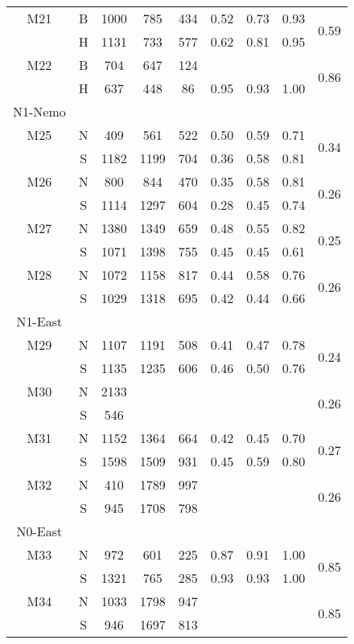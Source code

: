 \begin{longtable}{c c c c c c c c c}
  M21 & B & 1000 & 785 & 434 & 0.52 & 0.73 & 0.93 & \multirow{2}{*}{0.59} \\
      & H & 1131 & 733 & 577 & 0.62 & 0.81 & 0.95 & \\
  M22 & B & 704 & 647 & 124 &  &  &  & \multirow{2}{*}{0.86} \\
      & H & 637 & 448 & 86 & 0.95 & 0.93 & 1.00 & \\
  \midrule
  N1-Nemo\\
  \midrule
  M25 & N & 409 & 561 & 522 & 0.50 & 0.59 & 0.71 & \multirow{2}{*}{0.34} \\
      & S & 1182 & 1199 & 704 & 0.36 & 0.58 & 0.81 & \\
  M26 & N & 800 & 844 & 470 & 0.35 & 0.58 & 0.81 & \multirow{2}{*}{0.26} \\
      & S & 1114 & 1297 & 604 & 0.28 & 0.45 & 0.74 & \\
  M27 & N & 1380 & 1349 & 659 & 0.48 & 0.55 & 0.82 & \multirow{2}{*}{0.25} \\
      & S & 1071 & 1398 & 755 & 0.45 & 0.45 & 0.61 & \\
  M28 & N & 1072 & 1158 & 817 & 0.44 & 0.58 & 0.76 & \multirow{2}{*}{0.26} \\
      & S & 1029 & 1318 & 695 & 0.42 & 0.44 & 0.66 & \\
  \midrule
  N1-East\\
  \midrule
  M29 & N & 1107 & 1191 & 508 & 0.41 & 0.47 & 0.78 & \multirow{2}{*}{0.24} \\
      & S & 1135 & 1235 & 606 & 0.46 & 0.50 & 0.76 & \\
  M30 & N & 2133 &  &  &  &  &  & \multirow{2}{*}{0.26} \\
      & S & 546 &  &  &  &  &  &\\
  M31 & N & 1152 & 1364 & 664 & 0.42 & 0.45 & 0.70 & \multirow{2}{*}{0.27} \\
      & S & 1598 & 1509 & 931 & 0.45 & 0.59 & 0.80 & \\
  M32 & N & 410 & 1789 & 997 &  &  &  & \multirow{2}{*}{0.26} \\
      & S & 945 & 1708 & 798 &  &  &  & \\
  \midrule
  N0-East\\
  \midrule
  M33 & N & 972 & 601 & 225 & 0.87 & 0.91 & 1.00 & \multirow{2}{*}{0.85} \\
      & S & 1321 & 765 & 285 & 0.93 & 0.93 & 1.00 & \\
  M34 & N & 1033 & 1798 & 947 &  &  &  & \multirow{2}{*}{0.85} \\
      & S & 946 & 1697 & 813 &  &  &  & \\

\end{longtable}
